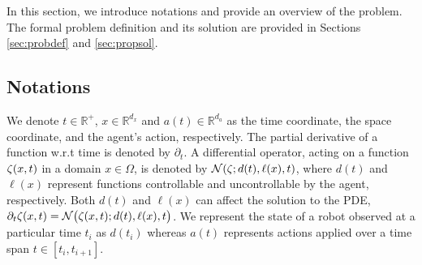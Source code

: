\iffalse
\begin{figure}[t!]
    \centering
    \texttt{[image: Figures/ModelScheme.png]}
      \caption{Indirect Interaction between the Agent and Wave. The latter evolves with the speed of sound over the time-dependent domain, $\Omega(d(t))$, defined by scatterers' radii and location, $d(t)$, which in turn evolve according to the dynamical control system, $F$, controllable by the agent's actions. This nested dynamics admits the physical realization of a real robot, which acts at a slow time-scale.}
    \label{fig:model_scheme}
\end{figure}
\fi


In this section, we introduce notations and provide an overview of the problem. The formal problem definition and its solution are provided in Sections \ref{sec:probdef} and \ref{sec:propsol}.

\subsection{Notations}

We denote $t\in \mathbb{R}^+$, $x\in \mathbb{R}^{d_x}$ and $a(t)\in \mathbb{R}^{d_a}$ as the time coordinate, the space coordinate, and the agent's action, respectively. The partial derivative of a function w.r.t time is denoted by $\partial_t$. A differential operator, acting on a function $\zeta(x, t)$ in a domain $x\in \Omega$, is denoted by $\mathcal{N}(\zeta; d(t), \ell(x), t)$, where $d(t)$ and $\ell(x)$ represent functions controllable and uncontrollable by the agent, respectively. Both $d(t)$ and $\ell(x)$ can affect the solution to the PDE, $\partial_t \zeta(x, t)=\mathcal{N}\bigl(\zeta(x, t); d(t), \ell(x), t\bigr)$. We represent the state of a robot observed at a particular time $t_i$ as $d(t_i)$ whereas $a(t)$ represents actions applied over a time span $t\in\left[t_i, t_{i+1}\right]$.



